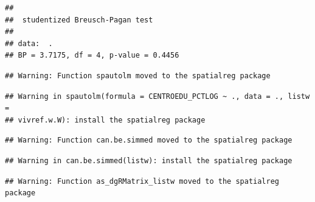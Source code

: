\documentclass[11pt,]{article}
\newenvironment{Shaded}{\begin{snugshade}}{\end{snugshade}}
\newcommand{\KeywordTok}[1]{\textcolor[rgb]{0.13,0.29,0.53}{\textbf{#1}}}
\newcommand{\DataTypeTok}[1]{\textcolor[rgb]{0.13,0.29,0.53}{#1}}
\newcommand{\StringTok}[1]{\textcolor[rgb]{0.31,0.60,0.02}{#1}}
\newcommand{\CommentTok}[1]{\textcolor[rgb]{0.56,0.35,0.01}{\textit{#1}}}
\newcommand{\OperatorTok}[1]{\textcolor[rgb]{0.81,0.36,0.00}{\textbf{#1}}}
\newcommand{\NormalTok}[1]{#1}
\begin{document}
\begin{Shaded}
\end{Shaded}

\begin{verbatim}
## 
##  studentized Breusch-Pagan test
## 
## data:  .
## BP = 3.7175, df = 4, p-value = 0.4456
\end{verbatim}

\begin{Shaded}
\end{Shaded}

\begin{verbatim}
## Warning: Function spautolm moved to the spatialreg package
\end{verbatim}

\begin{verbatim}
## Warning in spautolm(formula = CENTROEDU_PCTLOG ~ ., data = ., listw =
## vivref.w.W): install the spatialreg package
\end{verbatim}

\begin{verbatim}
## Warning: Function can.be.simmed moved to the spatialreg package
\end{verbatim}

\begin{verbatim}
## Warning in can.be.simmed(listw): install the spatialreg package
\end{verbatim}

\begin{verbatim}
## Warning: Function as_dgRMatrix_listw moved to the spatialreg package
\end{verbatim}
\end{document}

